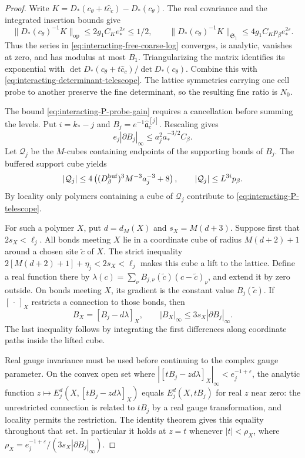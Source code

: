 \begin{proof}
Write $K=D_*(c_\theta+t\widehat c_c)-D_*(c_\theta)$.
The real covariance and the integrated insertion
bounds give
\[
 \|D_*(c_\theta)^{-1}K\|_{\mathrm{op}}\le
           2g_1C_Ke_*^{2\varepsilon}\le1/2,\qquad
 \|D_*(c_\theta)^{-1}K\|_{\mathfrak S_1}
           \le4g_1C_Kp_\beta e_*^{2\varepsilon}.
\]
Thus the series in \eqref{eq:interacting-free-coarse-log}
converges, is analytic, vanishes at zero, and
has modulus at most $B_1$. Triangularizing
the matrix identifies its exponential with
$\det D_*(c_\theta+t\widehat c_c)/\det D_*(c_\theta)$.
Combine this with
\eqref{eq:interacting-determinant-telescope}.
The lattice symmetries carrying one cell
probe to another preserve the fine determinant,
so the resulting fine ratio is $N_0$.

The bound \eqref{eq:interacting-P-probe-gain}
requires a cancellation before summing the levels.
Put $i=k_*-j$ and $B_j=e^{-1}\widehat{\mathfrak a}_c^{[j]}$.
Rescaling gives
\begin{equation}\label{eq:interacting-probe-derivative}
 e_j|\partial B_j|_\infty\le
                         a_j^2a_*^{-3/2}C_\beta .
\end{equation}
Let $\mathcal Q_j$ be the $M$-cubes containing
endpoints of the supporting bonds of $B_j$.
The buffered support cube yields
\begin{equation}\label{eq:interacting-probe-cube-count}
 |\mathcal Q_j|\le
 4\left((D_\beta^{\rm buf})^3M^{-3}a_j^{-3}+8\right),
 \qquad |\mathcal Q_j|\le L^{3i}p_\beta .
\end{equation}
By locality only polymers containing a cube
of $\mathcal Q_j$ contribute to
\eqref{eq:interacting-P-telescope}.

For such a polymer $X$, put $d=d_M(X)$ and
$s_X=M(d+3)$. Suppose first that $2s_X<\ell_j$.
All bonds meeting $X$ lie in a coordinate
cube of radius $M(d+2)+1$ around a chosen
site $\tilde c$ of $X$. The strict inequality
$2[M(d+2)+1]+\eta_j<2s_X<\ell_j$
makes this cube a lift to the lattice.
Define a real function there by
$\lambda(c)=\sum_\nu B_{j,\nu}(\tilde c)(c-\tilde c)_\nu$,
and extend it by zero outside. On bonds meeting
$X$, its gradient is the constant value
$B_j(\tilde c)$. If $[\,\cdot\,]_X$ restricts
a connection to those bonds, then
\[
 B_X=[B_j-d\lambda]_X,\qquad
 |B_X|_\infty\le3s_X|\partial B_j|_\infty.
\]
The last inequality follows by integrating
the first differences along coordinate paths
inside the lifted cube.

Real gauge invariance must be used before
continuing to the complex gauge parameter.
On the convex open set where
$|[tB_j-zd\lambda]_X|_\infty<e_j^{-1+\varepsilon}$,
the analytic function
$z\mapsto E_j^d(X,[tB_j-zd\lambda]_X)$
equals $E_j^d(X,tB_j)$ for real $z$ near zero:
the unrestricted connection is related to
$tB_j$ by a real gauge transformation, and
locality permits the restriction. The identity
theorem gives this equality throughout that
set. In particular it holds at $z=t$
whenever $|t|<\rho_X$, where
$\rho_X=e_j^{-1+\varepsilon}/(3s_X|\partial B_j|_\infty)$.


\end{proof}
